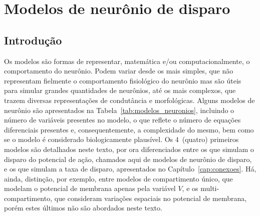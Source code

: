 \chapter{Modelos de neurônio de disparo}\label{cap:modelos}
\section{Introdução}\label{sec:modelos_intro}
Os modelos são formas de representar, matemática e/ou computacionalmente, o comportamento do neurônio. Podem variar desde os mais simples, que não representam fielmente o comportamento fisiológico do neurônio mas são úteis para simular grandes quantidades de neurônios, até os mais complexos, que trazem diversas representações de condutância e morfológicas. Alguns modelos de neurônio são apresentados na Tabela~\ref{tab:modelos_neuronios}, incluindo o número de variáveis presentes no modelo, o que reflete o número de equações diferenciais presentes e, consequentemente, a complexidade do mesmo, bem como se o modelo é considerado biologicamente plausível. Os 4~(quatro) primeiros modelos são detalhados neste texto, por ora diferenciados entre os que simulam o disparo do potencial de ação, chamados aqui de modelos de neurônio de disparo, e os que simulam a taxa de disparo, apresentados no Capítulo~\ref{cap:conexoes}. Há, ainda, distinção, por exemplo, entre modelos de compartimento único, que modelam o potencial de membrana apenas pela variável $V$, e os multi-compartimento, que consideram variações espaciais no potencial de membrana, porém estes últimos não são abordados neste texto.

\begin{table}
\end{table}

